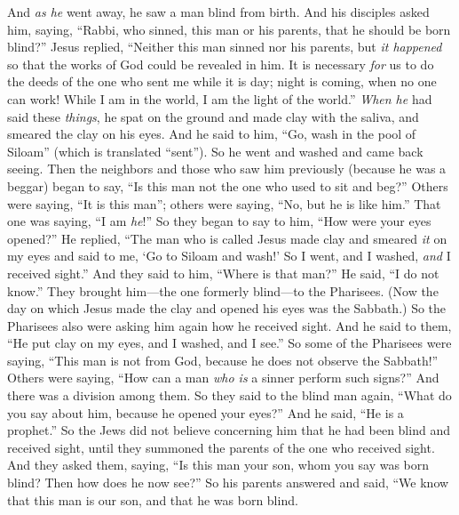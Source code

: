 \begin{biblechapter} %
 And \textit{as he} went away, he saw a man blind from birth.
\verse And his disciples asked him, saying, “Rabbi, who sinned, this man or his parents, that he should be born blind?”
\verse Jesus replied, “Neither this man sinned nor his parents, but \textit{it happened} so that the works of God could be revealed in him.
\verse It is necessary \textit{for} us to do the deeds of the one who sent me while it is day; night is coming, when no one can work!
\verse While I am in the world, I am the light of the world.”
\verse \textit{When he} had said these \textit{things}, he spat on the ground and made clay with the saliva, and smeared the clay on his eyes.
\verse And he said to him, “Go, wash in the pool of Siloam” (which is translated “sent”). So he went and washed and came back seeing.
\verse Then the neighbors and those who saw him previously (because he was a beggar) began to say, “Is this man not the one who used to sit and beg?”
\verse Others were saying, “It is this man”; others were saying, “No, but he is like him.” That one was saying, “I am \textit{he}!”
\verse So they began to say to him, “How were your eyes opened?”
\verse He replied, “The man who is called Jesus made clay and smeared \textit{it} on my eyes and said to me, ‘Go to Siloam and wash!’ So I went, and I washed, \textit{and} I received sight.”
\verse And they said to him, “Where is that man?” He said, “I do not know.”
 They brought him—the one formerly blind—to the Pharisees.
\verse (Now the day on which Jesus made the clay and opened his eyes was the Sabbath.)
\verse So the Pharisees also were asking him again how he received sight. And he said to them, “He put clay on my eyes, and I washed, and I see.”
\verse So some of the Pharisees were saying, “This man is not from God, because he does not observe the Sabbath!” Others were saying, “How can a man \textit{who is} a sinner perform such signs?” And there was a division among them.
\verse So they said to the blind man again, “What do you say about him, because he opened your eyes?” And he said, “He is a prophet.”
\verse So the Jews did not believe concerning him that he had been blind and received sight, until they summoned the parents of the one who received sight.
\verse And they asked them, saying, “Is this man your son, whom you say was born blind? Then how does he now see?”
\verse So his parents answered and said, “We know that this man is our son, and that he was born blind.

\end{biblechapter}
